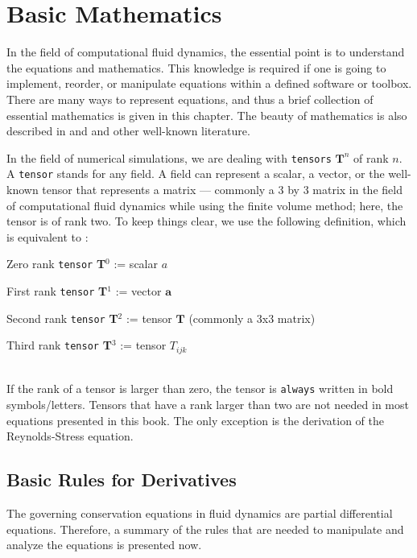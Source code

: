 \documentclass[MathematicsNumericsDerivationsAndOpenFOAM.tex]{subfiles}
\begin{document}


\chapter{Basic Mathematics}
\label{CHAPTER::Mathematics}
%
%
%
    In the field of computational fluid dynamics, the essential point is to
    understand the equations and mathematics. This knowledge is required if one
    is going to implement, reorder, or manipulate equations within a defined
    software or toolbox. There are many ways to represent equations, and thus a
    brief collection of essential mathematics is given in this chapter. The
    beauty of mathematics is also described in \cite{JasakPhD, Rappaz, ProgrammersGuide}
    and \cite{Moukalled15} and other well-known literature.


    In the field of numerical simulations, we are dealing with \texttt{tensors}
    $\textbf{T}^n$ of rank $n$. A \texttt{tensor} stands for any field. A field
    can represent a scalar, a vector, or the well-known tensor that represents
    a matrix --- commonly a 3 by 3 matrix in the field of computational fluid
    dynamics while using the finite volume method; here, the tensor is of rank
    two. To keep things clear, we use the following definition, which is
    equivalent to \cite{ProgrammersGuide}:
%
%
	\vspace{0.5cm}

	Zero rank \texttt{tensor} \textbf{T}$^0$ := scalar $a$

	First rank \texttt{tensor} \textbf{T}$^1$ := vector $\textbf{a}$

	Second rank \texttt{tensor} \textbf{T}$^2$ := tensor $\textbf{T}$ (commonly a 3x3 matrix)

	Third rank \texttt{tensor} \textbf{T}$^3$ := tensor $T_{ijk}$

	~\\
%
%
	If the rank of a tensor is larger than zero, the tensor is \texttt{always}
    written in bold symbols/letters. Tensors that have a rank larger than two
    are not needed in most equations presented in this book. The only exception
    is the derivation of the Reynolds-Stress equation.
%
%
\section{Basic Rules for Derivatives}
%
%
	The governing conservation equations in fluid dynamics are partial
    differential equations. Therefore, a summary of the rules that are needed
    to manipulate and analyze the equations is presented now.
\end{document}
